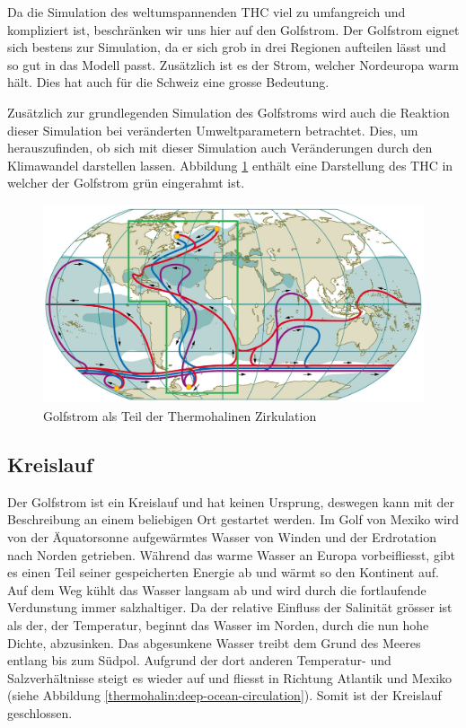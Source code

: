 Da die Simulation des weltumspannenden THC viel zu umfangreich und kompliziert ist, beschränken wir uns hier auf den Golfstrom.
Der Golfstrom eignet sich bestens zur Simulation, da er sich grob in drei Regionen aufteilen lässt und so gut in das Modell passt. Zusätzlich ist es der Strom, welcher Nordeuropa warm hält. Dies hat auch für die Schweiz eine grosse Bedeutung.

Zusätzlich zur grundlegenden Simulation des Golfstroms wird auch die Reaktion dieser Simulation bei veränderten Umweltparametern betrachtet. Dies, um herauszufinden, ob sich mit dieser Simulation auch Veränderungen durch den Klimawandel darstellen lassen. Abbildung \ref{thermohalin:Deep-Ocean-Currents} enthält eine Darstellung des THC in welcher der Golfstrom grün eingerahmt ist. 

\begin{figure}
	\includegraphics[width=12cm]{thermohalin/Bilder/Deep-Ocean-Currents2.jpg}
	\centering
	\caption{Golfstrom als Teil der Thermohalinen Zirkulation\label{thermohalin:Deep-Ocean-Currents}}
\end{figure}



\subsection{Kreislauf}

Der Golfstrom ist ein Kreislauf und hat keinen Ursprung, deswegen kann mit der Beschreibung an einem beliebigen Ort gestartet werden. Im Golf von Mexiko wird von der Äquatorsonne aufgewärmtes Wasser von Winden und der Erdrotation nach Norden getrieben. Während das warme Wasser an Europa vorbeifliesst, gibt es einen Teil seiner gespeicherten Energie ab und wärmt so den Kontinent auf.
Auf dem Weg kühlt das Wasser langsam ab und wird durch die fortlaufende Verdunstung immer salzhaltiger. Da der relative Einfluss der Salinität grösser ist als der, der Temperatur, beginnt das Wasser im Norden, durch die nun hohe Dichte, abzusinken. Das abgesunkene Wasser treibt dem Grund des Meeres entlang bis zum Südpol. Aufgrund der dort anderen Temperatur- und Salzverhältnisse steigt es wieder auf und fliesst in Richtung Atlantik und Mexiko (siehe Abbildung \ref{thermohalin:deep-ocean-circulation}). Somit ist der Kreislauf geschlossen.

